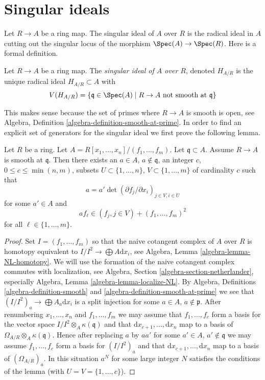 \section{Singular ideals}
\label{section-singular-ideal}

\noindent
Let $R \to A$ be a ring map. The singular ideal of $A$ over $R$
is the radical ideal in $A$ cutting out the singular locus of the
morphism $\Spec(A) \to \Spec(R)$. Here is a formal definition.

\begin{definition}
\label{definition-singular-ideal}
Let $R \to A$ be a ring map. The {\it singular ideal of $A$ over $R$},
denoted $H_{A/R}$ is the unique radical ideal $H_{A/R} \subset A$ with
$$
V(H_{A/R}) = \{\mathfrak q \in \Spec(A) \mid R \to A
\text{ not smooth at }\mathfrak q\}
$$
\end{definition}

\noindent
This makes sense because the set of primes where $R \to A$ is smooth
is open, see
Algebra, Definition \ref{algebra-definition-smooth-at-prime}.
In order to find an explicit set
of generators for the singular ideal we first prove the following lemma.

\begin{lemma}
\label{lemma-find-strictly-standard}
Let $R$ be a ring. Let $A = R[x_1, \ldots, x_n]/(f_1, \ldots, f_m)$.
Let $\mathfrak q \subset A$. Assume $R \to A$ is smooth
at $\mathfrak q$. Then there exists an $a \in A$, $a \not \in \mathfrak q$,
an integer $c$, $0 \leq c \leq \min(n, m)$, subsets
$U \subset \{1, \ldots, n\}$, $V \subset \{1, \ldots, m\}$
of cardinality $c$ such that
$$
a = a' \det(\partial f_j/\partial x_i)_{j \in V, i \in U}
$$
for some $a' \in A$ and
$$
a f_\ell \in (f_j, j \in V) + (f_1, \ldots, f_m)^2
$$
for all $\ell \in \{1, \ldots, m\}$.
\end{lemma}

\begin{proof}
Set $I = (f_1, \ldots, f_m)$ so that the naive cotangent
complex of $A$ over $R$ is homotopy equivalent to
$I/I^2 \to \bigoplus A\text{d}x_i$, see
Algebra, Lemma \ref{algebra-lemma-NL-homotopy}.
We will use the formation of the naive cotangent complex commutes with
localization, see Algebra, Section \ref{algebra-section-netherlander},
especially Algebra, Lemma \ref{algebra-lemma-localize-NL}.
By Algebra, Definitions \ref{algebra-definition-smooth} and
\ref{algebra-definition-smooth-at-prime}
we see that $(I/I^2)_a \to \bigoplus A_a\text{d}x_i$
is a split injection for some $a \in A$, $a \not \in \mathfrak p$.
After renumbering $x_1, \ldots, x_n$ and $f_1, \ldots, f_m$ we may
assume that $f_1, \ldots, f_c$ form a basis for
the vector space $I/I^2 \otimes_A \kappa(\mathfrak q)$ and that
$\text{d}x_{c + 1}, \ldots, \text{d}x_n$ map to a basis of
$\Omega_{A/R} \otimes_A \kappa(\mathfrak q)$. Hence after replacing $a$
by $aa'$ for some $a' \in A$, $a' \not \in \mathfrak q$ we may assume
$f_1, \ldots, f_c$ form a basis for $(I/I^2)_a$ and that
$\text{d}x_{c + 1}, \ldots, \text{d}x_n$ map to a basis of
$(\Omega_{A/R})_a$. In this situation $a^N$ for some large integer
$N$ satisfies the conditions of the lemma (with $U = V = \{1, \ldots, c\}$).
\end{proof}


